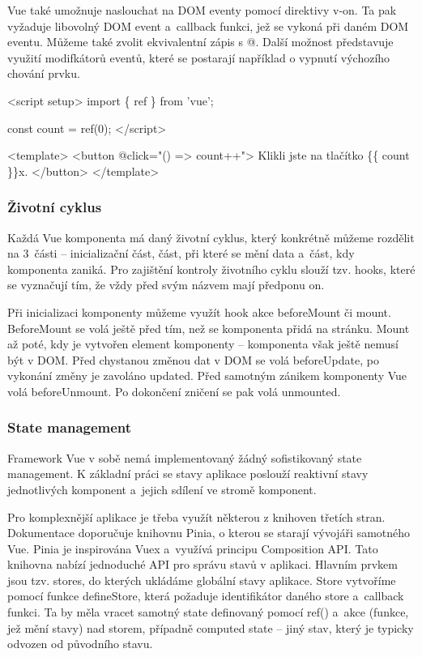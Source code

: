 Vue také umožnuje naslouchat na DOM eventy pomocí direktivy v-on. Ta pak vyžaduje libovolný DOM event a~callback funkci, jež se vykoná při daném DOM eventu. 
Můžeme také zvolit ekvivalentní zápis s @. Další možnost představuje využití modifkátorů eventů, které se postarají například o vypnutí výchozího chování prvku.\cite{vuemacrae,vue}

\begin{prog}
<script setup>
  import \{ ref \} from 'vue';

  const count = ref(0);
</script>

<template>
  <button @click="() => count++">
    Klikli jste na tlačítko \{\{ count \}\}x.
  </button>
</template>
\end{prog}

\subsubsection{Životní cyklus}

Každá Vue komponenta má daný životní cyklus, který konkrétně můžeme rozdělit na 3~části -- inicializační část, část, při které se mění data a~část, kdy komponenta zaniká. 
Pro zajištění kontroly životního cyklu slouží tzv. hooks, které se vyznačují tím, že vždy před svým názvem mají předponu on.

Při inicializaci komponenty můžeme využít hook akce beforeMount či mount. BeforeMount se volá ještě před tím, než se komponenta přidá na stránku. 
Mount až poté, kdy je vytvořen element komponenty -- komponenta však ještě nemusí být v DOM. 
Před chystanou změnou dat v DOM se volá beforeUpdate, po vykonání změny je zavoláno updated. Před samotným zánikem komponenty Vue volá beforeUnmount. 
Po dokončení zničení se pak volá unmounted.\cite{vuemacrae,vue}

\subsubsection{State management}

Framework Vue v sobě nemá implementovaný žádný sofistikovaný state management. 
K základní práci se stavy aplikace poslouží reaktivní stavy jednotlivých komponent a~jejich sdílení ve stromě komponent.

Pro komplexnější aplikace je třeba využít některou z knihoven třetích stran. Dokumentace doporučuje knihovnu Pinia, o kterou se starají vývojáři samotného Vue. 
Pinia je inspirována Vuex a~využívá principu Composition API. Tato knihovna nabízí jednoduché API pro správu stavů v aplikaci. 
Hlavním prvkem jsou tzv. stores, do kterých ukládáme globální stavy aplikace. 
Store vytvoříme pomocí funkce defineStore, která požaduje identifikátor daného store a~callback funkci. 
Ta by měla vracet samotný state definovaný pomocí ref() a~akce (funkce, jež mění stavy) nad storem, případně computed state -- jiný stav, který je typicky odvozen od původního stavu.\cite{pinia,vue}

